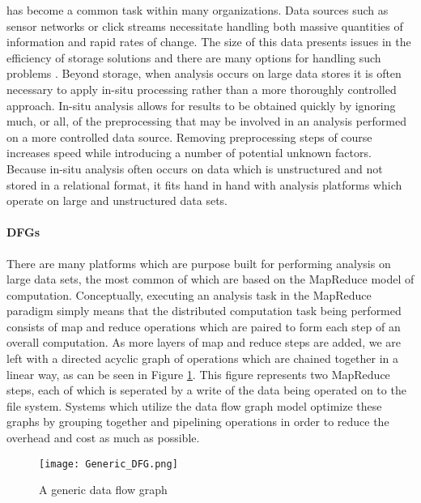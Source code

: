  has become a common task within many organizations. Data sources such as sensor networks or click streams necessitate handling both massive quantities of information and rapid rates of change. The size of this data presents issues in the efficiency of storage solutions and there are many options for handling such problems \cite{Klasky2011}. Beyond storage, when analysis occurs on large data stores it is often necessary to apply in-situ processing rather than a more thoroughly controlled approach. In-situ analysis allows for results to be obtained quickly by ignoring much, or all, of the preprocessing that may be involved in an analysis performed on a more controlled data source. Removing preprocessing steps of course increases speed while introducing a number of potential unknown factors. Because in-situ analysis often occurs on data which is unstructured and not stored in a relational format, it fits hand in hand with analysis platforms which operate on large and unstructured data sets.

\paragraph{DFGs}
There are many platforms which are purpose built for performing analysis on large data sets, the most common of which are based on the MapReduce model of computation. Conceptually, executing an analysis task in the MapReduce paradigm simply means that the distributed computation task being performed consists of map and reduce operations which are paired to form each step of an overall computation. As more layers of map and reduce steps are added, we are left with a directed acyclic graph of operations which are chained together in a linear way, as can be seen in  Figure \ref{fig:dfg}. This figure represents two MapReduce steps, each of which is seperated by a write of the data being operated on to the file system. Systems which utilize the data flow graph model optimize these graphs by grouping together and pipelining operations in order to reduce the overhead and cost as much as possible.

\begin{figure}
	\centering
	\texttt{[image: Generic\_DFG.png]}
	\caption{A generic data flow graph \cite{Ho2008}}
	\label{fig:dfg}
\end{figure}

